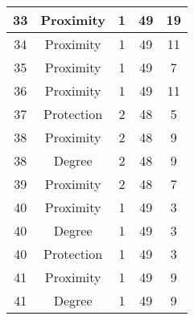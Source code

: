 \documentclass[results.tex]{subfiles}
\begin{document}
\begin{center}
\begin{tabular}{| c || c | c | c | c |}
            \hline
            33                      & Proximity                    & 1                      & 49                      & 19                   \\
            \hline
            34                      & Proximity                    & 1                      & 49                      & 11                   \\
            \hline
            35                      & Proximity                    & 1                      & 49                      & 7                    \\
            \hline
            36                      & Proximity                    & 1                      & 49                      & 11                   \\
            \hline
            37                      & Protection                   & 2                      & 48                      & 5                    \\
            \hline
            38                      & Proximity                    & 2                      & 48                      & 9                    \\
            \hline
            38                      & Degree                       & 2                      & 48                      & 9                    \\
            \hline
            39                      & Proximity                    & 2                      & 48                      & 7                    \\
            \hline
            40                      & Proximity                    & 1                      & 49                      & 3                    \\
            \hline
            40                      & Degree                       & 1                      & 49                      & 3                    \\
            \hline
            40                      & Protection                   & 1                      & 49                      & 3                    \\
            \hline
            41                      & Proximity                    & 1                      & 49                      & 9                    \\
            \hline
            41                      & Degree                       & 1                      & 49                      & 9                    \\

\end{tabular}
\end{center}
\end{document}
